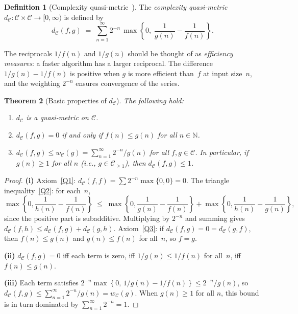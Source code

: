 \documentclass[11pt,a4paper]{article}
\theoremstyle{plain}
\newtheorem{theoreminner}{Theorem}[section]
\theoremstyle{definition}
\newtheorem{definitioninner}[theoreminner]{Definition}
\newenvironment{theorem}[1][]{\begin{theoreminner}[#1]}{\end{theoreminner}}
\newenvironment{definition}[1][]{\begin{definitioninner}[#1]}{\end{definitioninner}}
\newcommand{\N}{\mathbb{N}}
\newcommand{\C}{\mathcal{C}}
\begin{document}
\begin{definition}[Complexity quasi-metric~\cite{schellekens1995}]
\label{def:dc}
The \emph{complexity quasi-metric} $d_\C\colon\C\times\C\to[0,\infty)$
is defined by
\[
  d_\C(f,g)
  \;=\; \sum_{n=1}^{\infty} 2^{-n}\,
    \max\!\left\{0,\;\frac{1}{g(n)}-\frac{1}{f(n)}\right\}.
\]
\end{definition}

The reciprocals $1/f(n)$ and $1/g(n)$ should be thought of as
\emph{efficiency measures}: a faster algorithm has a larger reciprocal.
The difference $1/g(n)-1/f(n)$ is positive when $g$ is more efficient
than~$f$ at input size~$n$, and the weighting $2^{-n}$ ensures
convergence of the series.

\begin{theorem}[Basic properties of $d_\C$]\label{thm:dc-props}
The following hold:
\begin{enumerate}[label=\textup{(\roman*)}]
  \item $d_\C$ is a quasi-metric on $\C$.
  \item $d_\C(f,g)=0$ if and only if $f(n)\le g(n)$ for all $n\in\N$.
  \item $d_\C(f,g)\le w_\C(g)=\sum_{n=1}^\infty 2^{-n}/g(n)$ for all
    $f,g\in\C$.  In particular, if $g(n)\ge 1$ for all $n$ (i.e.,
    $g\in\C_{\ge 1}$), then $d_\C(f,g)\le 1$.
\end{enumerate}
\end{theorem}

\begin{proof}
\textbf{(i)}  Axiom~\ref{Q1}: $d_\C(f,f)=\sum 2^{-n}\max\{0,0\}=0$.
The triangle inequality~\ref{Q2}: for each~$n$,
\[
  \max\left\{0,\frac{1}{h(n)}-\frac{1}{f(n)}\right\}
  \;\le\;
  \max\left\{0,\frac{1}{g(n)}-\frac{1}{f(n)}\right\}
  +\max\left\{0,\frac{1}{h(n)}-\frac{1}{g(n)}\right\},
\]
since the positive part is subadditive.  Multiplying by $2^{-n}$ and
summing gives $d_\C(f,h)\le d_\C(f,g)+d_\C(g,h)$.  Axiom~\ref{Q3}:
if $d_\C(f,g)=0=d_\C(g,f)$, then $f(n)\le g(n)$ and $g(n)\le f(n)$
for all~$n$, so $f=g$.

\textbf{(ii)}  $d_\C(f,g)=0$ iff each term is zero, iff
$1/g(n)\le 1/f(n)$ for all~$n$, iff $f(n)\le g(n)$.

\textbf{(iii)}  Each term satisfies
$2^{-n}\max\left\{0,\,1/g(n)-1/f(n)\right\}\le 2^{-n}/g(n)$, so
$d_\C(f,g)\le\sum_{n=1}^\infty 2^{-n}/g(n)=w_\C(g)$.  When
$g(n)\ge 1$ for all $n$, this bound is in turn dominated by
$\sum_{n=1}^\infty 2^{-n}=1$.
\end{proof}
\end{document}

